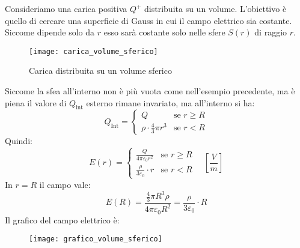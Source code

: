 \documentclass[a4paper]{article}
\begin{document}
\begin{example}
  Consideriamo una carica positiva \( Q^+ \) distribuita su un volume. L'obiettivo è
  quello di cercare una superficie di Gauss in cui il campo elettrico sia costante.
  Siccome dipende solo da \( r \) esso sarà costante solo nelle sfere \( S(r) \) di raggio
  \( r \).
  \begin{figure}[H]
    \centering
    \texttt{[image: carica\_volume\_sferico]}
    \caption{Carica distribuita su un volume sferico}
  \end{figure}
  \noindent
  Siccome la sfea all'interno non è più vuota come nell'esempio precedente, ma è piena
  il valore di \( Q_{\text{int}} \) esterno rimane invariato, ma all'interno si ha:
  \[
    Q_{\text{Int}} = 
    \begin{cases}
      Q & \text{se } r \ge R\\
      \rho \cdot \frac{4}{3} \pi r^3 & \text{se } r < R
    \end{cases}
  \] 
  Quindi:
  \[
    E(r) = \begin{cases}
      \frac{Q}{4 \pi \varepsilon_0 r^2} & \text{se } r \ge R\\
      \frac{\rho}{3 \varepsilon_0} \cdot r & \text{se } r < R
    \end{cases}
    \quad \left[ \frac{V}{m} \right]
  \]
  In \( r = R \) il campo vale:
  \[
    E(R) = \frac{\frac{4}{3} \pi R^3 \rho}{4 \pi \varepsilon_0 R^2} 
    = \frac{\rho}{3 \varepsilon_0} \cdot R
  \] 
  Il grafico del campo elettrico è:
  \begin{figure}[H]
    \centering
    \texttt{[image: grafico\_volume\_sferico]}
  \end{figure}
\end{example}
\end{document}
